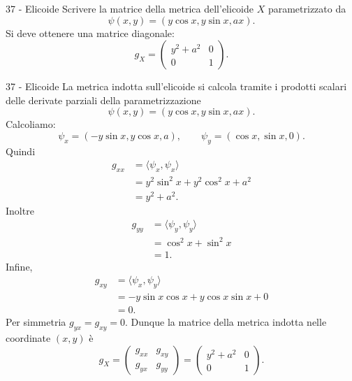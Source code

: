 \documentclass[a4paper]{article}
\begin{document}
\begin{snippetexercise}{37 - Elicoide}
    Scrivere la matrice della metrica dell'elicoide \(X\) parametrizzato da
    \[
        \psi(x,y)=
        \left(
            y\cos x,
            y\sin x,
            ax
        \right).
    \]
    Si deve ottenere una matrice diagonale:
    \[
        g_X
        =
        \begin{pmatrix}
            y^2+a^2 & 0\\
            0 & 1
        \end{pmatrix}.
    \]
\end{snippetexercise}

\begin{snippetsolution}{37 - Elicoide}
    La metrica indotta sull'elicoide si calcola tramite i prodotti scalari delle derivate parziali della parametrizzazione
    \[
        \psi(x,y)=
        \left(
            y\cos x,
            y\sin x,
            ax
        \right).
    \]
    Calcoliamo:
    \[
        \psi_x
        =
        \left(
            -y\sin x,
            y\cos x,
            a
        \right),
        \qquad
        \psi_y
        =
        \left(
            \cos x,
            \sin x,
            0
        \right).
    \]
    Quindi
    \begin{align*}
        g_{xx}
        &=
        \langle \psi_x,\psi_x\rangle\\
        &=
        y^2\sin^2x+y^2\cos^2x+a^2\\
        &=
        y^2+a^2.
    \end{align*}
    Inoltre
    \begin{align*}
        g_{yy}
        &=
        \langle \psi_y,\psi_y\rangle\\
        &=
        \cos^2x+\sin^2x\\
        &=
        1.
    \end{align*}
    Infine,
    \begin{align*}
        g_{xy}
        &=
        \langle \psi_x,\psi_y\rangle\\
        &=
        -y\sin x\cos x+y\cos x\sin x+0\\
        &=
        0.
    \end{align*}
    Per simmetria \(g_{yx}=g_{xy}=0\). Dunque la matrice della metrica indotta nelle coordinate \((x,y)\) è
    \[
        g_X
        =
        \begin{pmatrix}
            g_{xx} & g_{xy}\\
            g_{yx} & g_{yy}
        \end{pmatrix}
        =
        \begin{pmatrix}
            y^2+a^2 & 0\\
            0 & 1
        \end{pmatrix}.
    \]
\end{snippetsolution}
\end{document}
